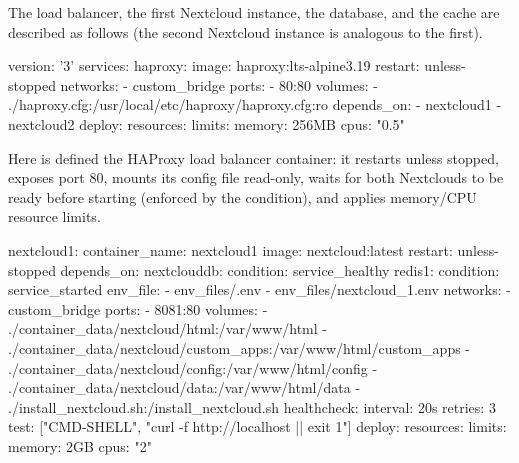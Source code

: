 \begin{exampleblock}
    The load balancer, the first Nextcloud instance, the database, and the cache are described as follows (the second Nextcloud instance is analogous to the first).

    \vspace{-0.5em}

    \begin{codeblock}[language=bash,basicstyle=\ttfamily\tiny,numberstyle=\tiny]
version: '3'
services:
  haproxy:
    image: haproxy:lts-alpine3.19
    restart: unless-stopped
    networks:
      - custom_bridge
    ports:
      - 80:80
    volumes:
      - ./haproxy.cfg:/usr/local/etc/haproxy/haproxy.cfg:ro
    depends_on:
      - nextcloud1
      - nextcloud2
    deploy:
      resources:
        limits:
          memory: 256MB
          cpus: "0.5"
\end{codeblock}

\vspace{-0.7em}

    Here is defined the HAProxy load balancer container: it restarts unless stopped, exposes port 80, mounts its config file read-only, waits for both Nextclouds to be ready before starting (enforced by the  condition), and applies memory/CPU resource limits.

\vspace{-0.7em}

\begin{codeblock}[language=bash,basicstyle=\ttfamily\tiny,firstnumber=20, numberstyle=\tiny]
  nextcloud1:
    container_name: nextcloud1
    image: nextcloud:latest
    restart: unless-stopped
    depends_on:
      nextclouddb:
        condition: service_healthy
      redis1:
        condition: service_started
    env_file:
      - env_files/.env
      - env_files/nextcloud_1.env
    networks:
      - custom_bridge
    ports:
      - 8081:80
    volumes:
      - ./container_data/nextcloud/html:/var/www/html
      - ./container_data/nextcloud/custom_apps:/var/www/html/custom_apps
      - ./container_data/nextcloud/config:/var/www/html/config
      - ./container_data/nextcloud/data:/var/www/html/data
      - ./install_nextcloud.sh:/install_nextcloud.sh
    healthcheck:
      interval: 20s
      retries: 3
      test: ["CMD-SHELL", "curl -f http://localhost || exit 1"]
    deploy:
      resources:
        limits:
          memory: 2GB
          cpus: "2"
\end{codeblock}


\end{exampleblock}
